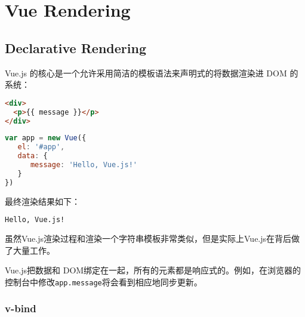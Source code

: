 \begin{lstlisting}[language=JavaScript]

\end{lstlisting}




\begin{lstlisting}[language=JavaScript]

\end{lstlisting}



\begin{lstlisting}[language=JavaScript]

\end{lstlisting}





\chapter{Vue Rendering}



\section{Declarative Rendering}



Vue.js 的核心是一个允许采用简洁的模板语法来声明式的将数据渲染进 DOM 的系统：


\begin{lstlisting}[language=HTML]
<div>
  <p>{{ message }}</p>
</div>
\end{lstlisting}



\begin{lstlisting}[language=JavaScript]
var app = new Vue({
   el: '#app',
   data: {
      message: 'Hello, Vue.js!'
   }
})
\end{lstlisting}


最终渲染结果如下：

\begin{lstlisting}[language=HTML]
Hello, Vue.js!
\end{lstlisting}


虽然Vue.js渲染过程和渲染一个字符串模板非常类似，但是实际上Vue.js在背后做了大量工作。

Vue.js把数据和 DOM绑定在一起，所有的元素都是响应式的。例如，在浏览器的控制台中修改\texttt{app.message}将会看到相应地同步更新。

\subsection{v-bind}


